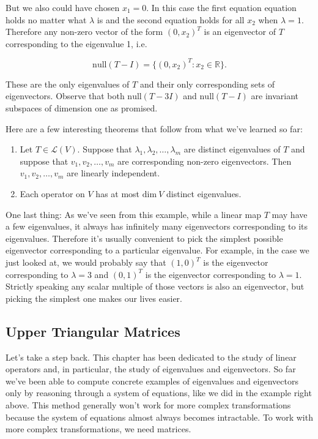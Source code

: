 \documentclass[12pt]{article}
\begin{document}
But we also could have chosen $x_1 = 0$. In this case the first equation equation holds no matter what $\lambda$ is and the second equation holds for all $x_2$ when $\lambda = 1$. Therefore any non-zero vector of the form $(0, x_2)^T$ is an eigenvector of $T$ corresponding to the eigenvalue 1, i.e.

$$\textrm{null} (T - I) = \{ (0, x_2)^T : x_2 \in \mathbb{R} \}.$$

These are the only eigenvalues of $T$ and their only corresponding sets of eigenvectors. Observe that both $\textrm{null} (T - 3I)$ and $\textrm{null} (T - I)$ are invariant subspaces of dimension one as promised.

Here are a few interesting theorems that follow from what we've learned so far:

\begin{enumerate}
\item Let $T \in \mathcal{L} (V)$. Suppose that $\lambda_1, \lambda_2, \ldots, \lambda_m$ are distinct eigenvalues of $T$ and suppose that $v_1, v_2, \ldots, v_m$ are corresponding non-zero eigenvectors. Then $v_1, v_2, \ldots, v_m$ are linearly independent.

\item Each operator on $V$ has at most $\textrm{dim} \: V$ distinct eigenvalues.

\end{enumerate}

\vskip 3mm
One last thing: As we've seen from this example, while a linear map $T$ may have a few eigenvalues, it always has infinitely many eigenvectors corresponding to its eigenvalues. Therefore it's usually convenient to pick the simplest possible eigenvector corresponding to a particular eigenvalue. For example, in the case we just looked at, we would probably say that $(1, 0)^T$ is the eigenvector corresponding to $\lambda = 3$ and $(0, 1)^T$ is the eigenvector corresponding to $\lambda = 1$. Strictly speaking any scalar multiple of those vectors is also an eigenvector, but picking the simplest one makes our lives easier. 

\subsection*{Upper Triangular Matrices}

Let's take a step back. This chapter has been dedicated to the study of linear operators and, in particular, the study of eigenvalues and eigenvectors. So far we've been able to compute concrete examples of eigenvalues and eigenvectors only by reasoning through a system of equations, like we did in the example right above. This method generally won't work for more complex transformations because the system of equations almost always becomes intractable. To work with more complex transformations, we need matrices.
\end{document}
